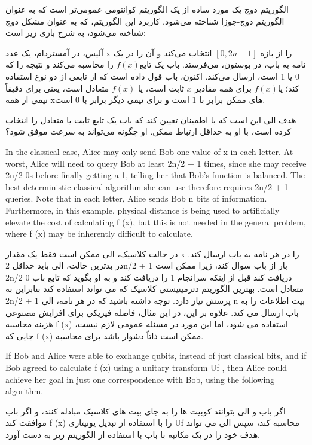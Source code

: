 \documentclass{book}
\begin{document}
الگوریتم دوچ یک مورد ساده از یک الگوریتم کوانتومی عمومی‌تر است که به عنوان الگوریتم دوچ-جوزا شناخته می‌شود. کاربرد این الگوریتم، که به عنوان مشکل دوچ شناخته می‌شود، به شرح بازی زیر است:

آلیس، در آمستردام، یک عدد x را از بازه‌ $[0, 2n-1]$ انتخاب می‌کند و آن را در یک نامه به باب، در بوستون، می‌فرستد. باب یک تابع$ f(x)$ را محاسبه می‌کند و نتیجه را که 0 یا 1 است، ارسال می‌کند. اکنون، باب قول داده است که از تابعی از دو نوع استفاده کند؛ یا$ f(x)$ برای همه مقادیر $x$ ثابت است، یا $f(x)$ متعادل است، یعنی برای دقیقاً نیمی از همه xهای ممکن برابر با 1 است و برای نیمی دیگر برابر با 0 است.

هدف الی این است که با اطمینان تعیین کند که باب یک تابع ثابت یا متعادل را انتخاب کرده است، با او به حداقل ارتباط ممکن. او چگونه می‌تواند به سرعت موفق شود؟



In the classical case, Alice may only send Bob one value of x in each letter. At worst,
Alice will need to query Bob at least 2n/2 + 1 times, since she may receive 2n/2 0s before
finally getting a 1, telling her that Bob’s function is balanced. The best deterministic
classical algorithm she can use therefore requires 2n/2 + 1 queries. Note that in each
letter, Alice sends Bob n bits of information. Furthermore, in this example, physical
distance is being used to artificially elevate the cost of calculating f (x), but this is not
needed in the general problem, where f (x) may be inherently difficult to calculate.



در حالت کلاسیک، الی ممکن است فقط یک مقدار x را در هر نامه به باب ارسال کند. در بدترین حالت، الی باید حداقل 2n/2 + 1 بار از باب سوال کند، زیرا ممکن است 2n/2 0 دریافت کند قبل از اینکه
سرانجام 1 را دریافت کند و به او بگوید که تابع باب متعادل است. بهترین الگوریتم
دترمینیستی کلاسیک که می تواند استفاده کند بنابراین به 2n/2 + 1 پرسش نیاز دارد. توجه داشته باشید که در هر
نامه، الی n بیت اطلاعات را به باب ارسال می کند. علاوه بر این، در این مثال، فاصله فیزیکی
برای افزایش مصنوعی هزینه محاسبه f (x) استفاده می شود، اما این مورد در مسئله عمومی لازم نیست، جایی که f (x) ممکن است ذاتاً دشوار باشد برای محاسبه.
	
	
	
	If Bob and Alice were able to exchange qubits, instead of just classical bits, and if Bob
	agreed to calculate f (x) using a unitary transform Uf , then Alice could achieve her goal
	in just one correspondence with Bob, using the following algorithm.
	
	اگر باب و الی بتوانند کوبیت ها را به جای بیت های کلاسیک مبادله کنند، و اگر باب موافقت کند f (x) را با استفاده از تبدیل یونیتاری Uf محاسبه کند، سپس الی می تواند هدف خود را
	در یک مکاتبه با باب با استفاده از الگوریتم زیر به دست آورد.
	
\end{document}
